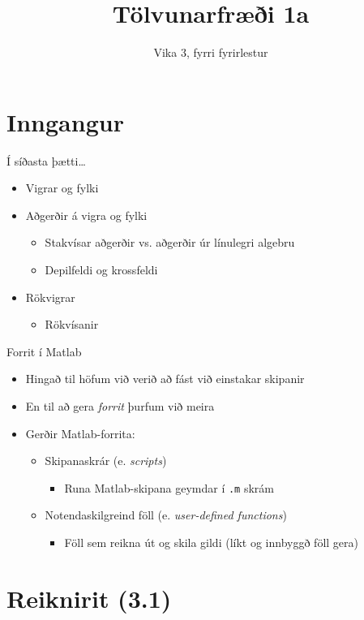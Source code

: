 \documentclass[handout]{beamer}
\title{Tölvunarfræði 1a}
\subtitle{Vika 3, fyrri fyrirlestur}
\begin{document}
\begin{frame}
\titlepage
\end{frame}

\section{Inngangur}

\begin{frame}{Í síðasta þætti\ldots}
\begin{itemize}
 \item Vigrar og fylki
 \item Aðgerðir á vigra og fylki
 \begin{itemize}
  \item Stakvísar aðgerðir vs. aðgerðir úr línulegri algebru
  \item Depilfeldi og krossfeldi
 \end{itemize}
 \item Rökvigrar
 \begin{itemize}
  \item Rökvísanir
 \end{itemize}
\end{itemize}
\end{frame}

\begin{frame}{Forrit í Matlab}
\begin{itemize}
 \item Hingað til höfum við verið að fást við einstakar skipanir
 \item En til að gera \emph{forrit} þurfum við meira
 \item Gerðir Matlab-forrita:
 \begin{itemize}
  \item Skipanaskrár (e. \emph{scripts})
  \begin{itemize}
   \item Runa Matlab-skipana geymdar í \texttt{.m} skrám
  \end{itemize}
  \item Notendaskilgreind föll (e. \emph{user-defined functions})
  \begin{itemize}
   \item Föll sem reikna út og skila gildi (líkt og innbyggð föll gera)
  \end{itemize}
 \end{itemize}
\end{itemize}
\end{frame}

\section{Reiknirit (3.1)}
\end{document}
